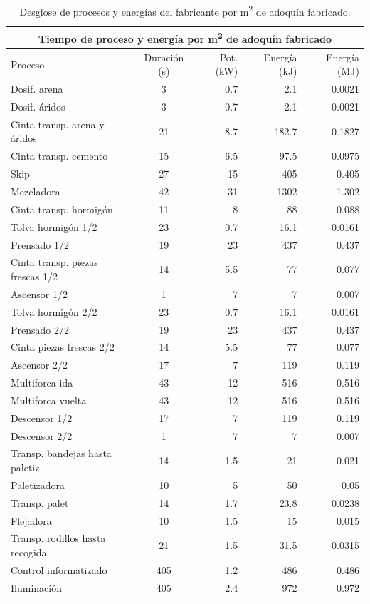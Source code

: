 \begin{table}[!htp]
\centering
\begin{tabular}{lcrrr}
\toprule
\multicolumn{5}{c}{Tiempo de proceso y energía por \si{m^2} de adoquín fabricado}\\
\midrule
Proceso & Duración (\si{s}) & Pot. (\si{kW}) & Energía (\si{kJ}) & Energía (\si{MJ})\\
\midrule
Dosif. arena & 3 & 0.7 & 2.1 & 0.0021\\
Dosif. áridos & 3 & 0.7 & 2.1 & 0.0021\\
Cinta transp. arena y áridos  & 21 & 8.7 & 182.7 & 0.1827\\
Cinta transp. cemento & 15 & 6.5 & 97.5 & 0.0975\\
Skip  & 27 & 15 & 405 & 0.405\\
Mezcladora & 42 & 31 & 1302 & 1.302\\
Cinta transp. hormigón & 11 & 8 & 88 & 0.088\\
Tolva hormigón 1/2 & 23 & 0.7 & 16.1 & 0.0161\\
Prensado 1/2 & 19 & 23 & 437 & 0.437\\
Cinta transp. piezas frescas 1/2 & 14 & 5.5 & 77 & 0.077\\
Ascensor 1/2 & 1 & 7 & 7 & 0.007\\
Tolva hormigón 2/2 & 23 & 0.7 & 16.1 & 0.0161\\
Prensado 2/2 & 19 & 23 & 437 & 0.437\\
Cinta piezas frescas 2/2 & 14 & 5.5 & 77 & 0.077\\
Ascensor 2/2 & 17 & 7 & 119 & 0.119\\
Multiforca ida & 43 & 12 & 516 & 0.516\\
Multiforca vuelta & 43 & 12 & 516 & 0.516\\
Descensor 1/2 & 17 & 7 & 119 & 0.119\\
Descensor 2/2 & 1 & 7 & 7 & 0.007\\
Transp. bandejas hasta paletiz. & 14 & 1.5 & 21 & 0.021\\
Paletizadora & 10 & 5 & 50 & 0.05\\
Transp. palet & 14 & 1.7 & 23.8 & 0.0238\\
Flejadora & 10 & 1.5 & 15 & 0.015\\
Transp. rodillos hasta recogida  & 21 & 1.5 & 31.5 & 0.0315\\
Control informatizado & 405 & 1.2 & 486 & 0.486\\
Iluminación & 405 & 2.4 & 972 & 0.972\\
\bottomrule
\end{tabular}
\caption{Desglose de procesos y energías del fabricante por \si{m^2} de adoquín fabricado.}
\label{desgloseenergia}
\end{table}

